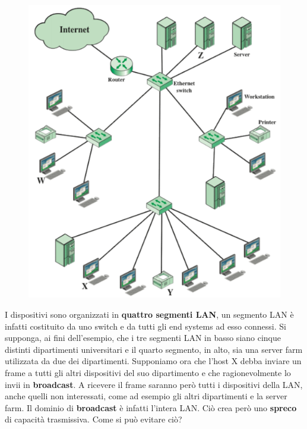 \documentclass[11pt,a4paper,oneside]{book}
\theoremstyle{definition}
\begin{document}
\begin{figure}
	\includegraphics[scale=0.35]{Immagini/Vlan.png}
	\centering
\end{figure}

I dispositivi sono organizzati in \textbf{quattro segmenti LAN}, un segmento LAN è infatti costituito da uno switch e da tutti gli end systems ad esso connessi. Si supponga, ai fini dell'esempio, che i tre segmenti LAN in basso siano cinque distinti dipartimenti universitari e il quarto segmento, in alto, sia una server farm utilizzata da due dei dipartimenti. Supponiamo ora che l'host X debba inviare un frame a tutti gli altri dispositivi del suo dipartimento e che ragionevolmente lo invii in \textbf{broadcast}. A ricevere il frame saranno però tutti i dispositivi della LAN, anche quelli non interessati, come ad esempio gli altri dipartimenti e la server farm. Il dominio di \textbf{broadcast} è infatti l'intera LAN. Ciò crea però uno \textbf{spreco} di capacità trasmissiva. Come si può evitare ciò?

\pagebreak
\end{document}

